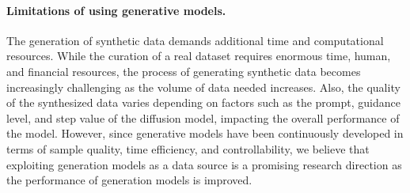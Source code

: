 \paragraph{Limitations of using generative models.}
The generation of synthetic data demands additional time and computational resources. 
While the curation of a real dataset requires enormous time, human, and financial resources, the process of generating synthetic data becomes increasingly challenging as the volume of data needed increases.
Also, the quality of the synthesized data varies depending on factors such as the prompt, guidance level, and step value of the diffusion model, impacting the overall performance of the model. 
However, since generative models have been continuously developed in terms of sample quality, time efficiency, and controllability,
we believe that exploiting generation models as a data source is a promising research direction as the performance of generation models is improved.


